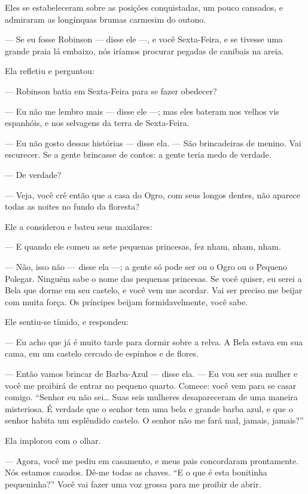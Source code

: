 Eles se estabeleceram sobre as posições conquistadas, um pouco
cansados, e admiraram as longínquas brumas carmesim do outono.

--- Se eu fosse Robinson --- disse ele ---, e você Sexta-Feira, e se tivesse
uma grande praia lá embaixo, nós iríamos procurar pegadas de canibais na
areia.

Ela refletiu e perguntou:

--- Robinson batia em Sexta-Feira para se fazer obedecer?

--- Eu não me lembro mais --- disse ele ---; mas eles bateram nos velhos vis
espanhóis, e nos selvagens da terra de Sexta-Feira.

--- Eu não gosto dessas histórias --- disse ela. --- São brincadeiras de
menino. Vai escurecer. Se a gente brincasse de contos: a gente teria medo
de verdade.

--- De verdade?

--- Veja, você crê então que a casa do Ogro, com seus longos dentes, não
aparece todas as noites no fundo da floresta?

Ele a considerou e bateu seus maxilares:

--- E quando ele comeu as sete pequenas princesas, fez nham, nham, nham.

--- Não, isso não --- disse ela ---; a gente só pode ser ou o Ogro ou o Pequeno
Polegar. Ninguém sabe o nome das pequenas princesas. Se você quiser, eu
serei a Bela que dorme em seu castelo, e você vem me acordar. Vai ser
preciso me beijar com muita força. Os príncipes beijam formidavelmente,
você sabe.

Ele sentiu-se tímido, e respondeu:

--- Eu acho que já é muito tarde para dormir sobre a relva. A Bela
estava em sua cama, em um castelo cercado de espinhos e de flores.

--- Então vamos brincar de Barba-Azul --- disse ela. --- Eu vou ser sua mulher
e você me proibirá de entrar no pequeno quarto. Comece: você vem para se
casar comigo. “Senhor eu não sei\ldots{} Suas seis mulheres desapareceram de uma
maneira misteriosa. É verdade que o senhor tem uma bela e grande barba
azul, e que o senhor habita um esplêndido castelo. O senhor não me fará
mal, jamais, jamais?”

Ela implorou com o olhar.

--- Agora, você me pediu em casamento, e meus pais concordaram
prontamente. Nós estamos casados. Dê-me todas as chaves. “E o que é esta
bonitinha pequeninha?” Você vai fazer uma voz grossa para me proibir de abrir.

